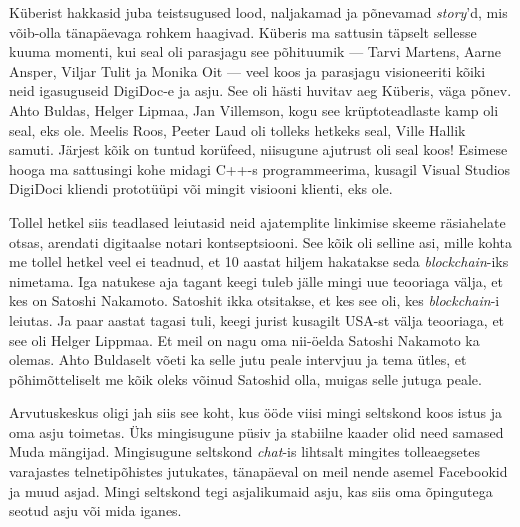 Küberist hakkasid juba teistsugused lood, naljakamad ja põnevamad 
\emph{story}'d, mis võib-olla tänapäevaga rohkem haagivad. Küberis ma sattusin 
täpselt sellesse kuuma momenti, kui seal oli parasjagu see põhituumik --- Tarvi 
Martens, Aarne Ansper, 
Viljar Tulit ja Monika Oit 
--- veel koos ja parasjagu visioneeriti kõiki neid igasuguseid DigiDoc-e ja 
asju. See oli hästi huvitav aeg Küberis, väga põnev. Ahto 
Buldas, Helger Lipmaa, Jan 
Villemson, kogu see krüptoteadlaste kamp oli seal, 
eks ole. Meelis Roos,  Peeter Laud oli tolleks hetkeks seal, Ville Hallik 
samuti. Järjest kõik on tuntud  korüfeed, niisugune ajutrust oli seal koos! 
Esimese hooga ma sattusingi kohe midagi C++-s programmeerima, 
kusagil Visual Studios DigiDoci kliendi prototüüpi või mingit visiooni klienti, 
eks ole. 

Tollel hetkel siis teadlased leiutasid neid ajatemplite linkimise skeeme 
räsiahelate otsas, arendati digitaalse notari kontseptsiooni. See kõik oli 
selline asi, mille kohta me tollel hetkel veel ei teadnud, et 10 aastat hiljem 
hakatakse seda \emph{blockchain}-iks nimetama. Iga natukese aja tagant keegi 
tuleb jälle mingi uue teooriaga välja, et kes on Satoshi Nakamoto. Satoshit 
ikka otsitakse, et kes see oli, kes \emph{blockchain}-i leiutas. Ja paar aastat 
tagasi tuli, keegi jurist 
kusagilt USA-st välja teooriaga, et see oli Helger Lippmaa. Et meil on nagu oma nii-öelda 
Satoshi Nakamoto ka olemas. Ahto Buldaselt võeti ka 
selle jutu peale intervjuu ja tema ütles, et põhimõtteliselt me kõik oleks 
võinud Satoshid olla, muigas selle jutuga peale. 


Arvutuskeskus oligi jah siis see koht, kus ööde viisi mingi seltskond koos 
istus ja oma asju toimetas. Üks mingisugune püsiv ja stabiilne kaader olid need 
samased Muda mängijad. Mingisugune seltskond \emph{chat}-is  lihtsalt mingites 
tolleaegsetes varajastes telnetipõhistes jutukates, 
tänapäeval on meil nende asemel Facebookid ja muud asjad. Mingi seltskond tegi  asjalikumaid asju, kas siis oma õpingutega seotud asju või mida iganes. 

